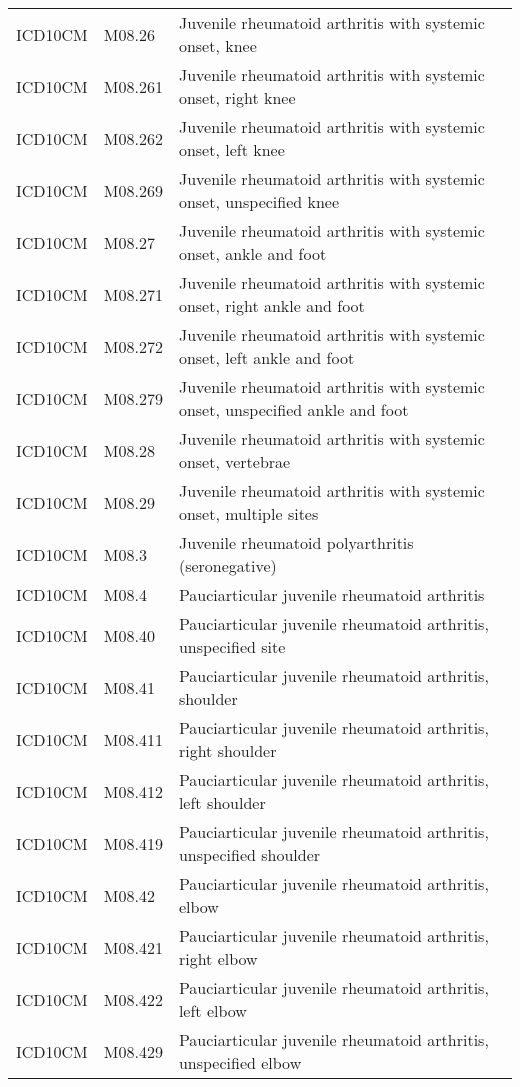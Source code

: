 \begin{longtable}{p{}p{}p{}}
  ICD10CM & M08.26 & Juvenile rheumatoid arthritis with systemic onset, knee \\ 
  ICD10CM & M08.261 & Juvenile rheumatoid arthritis with systemic onset, right knee \\ 
  ICD10CM & M08.262 & Juvenile rheumatoid arthritis with systemic onset, left knee \\ 
  ICD10CM & M08.269 & Juvenile rheumatoid arthritis with systemic onset, unspecified knee \\ 
  ICD10CM & M08.27 & Juvenile rheumatoid arthritis with systemic onset, ankle and foot \\ 
  ICD10CM & M08.271 & Juvenile rheumatoid arthritis with systemic onset, right ankle and foot \\ 
  ICD10CM & M08.272 & Juvenile rheumatoid arthritis with systemic onset, left ankle and foot \\ 
  ICD10CM & M08.279 & Juvenile rheumatoid arthritis with systemic onset, unspecified ankle and foot \\ 
  ICD10CM & M08.28 & Juvenile rheumatoid arthritis with systemic onset, vertebrae \\ 
  ICD10CM & M08.29 & Juvenile rheumatoid arthritis with systemic onset, multiple sites \\ 
  ICD10CM & M08.3 & Juvenile rheumatoid polyarthritis (seronegative) \\ 
  ICD10CM & M08.4 & Pauciarticular juvenile rheumatoid arthritis \\ 
  ICD10CM & M08.40 & Pauciarticular juvenile rheumatoid arthritis, unspecified site \\ 
  ICD10CM & M08.41 & Pauciarticular juvenile rheumatoid arthritis, shoulder \\ 
  ICD10CM & M08.411 & Pauciarticular juvenile rheumatoid arthritis, right shoulder \\ 
  ICD10CM & M08.412 & Pauciarticular juvenile rheumatoid arthritis, left shoulder \\ 
  ICD10CM & M08.419 & Pauciarticular juvenile rheumatoid arthritis, unspecified shoulder \\ 
  ICD10CM & M08.42 & Pauciarticular juvenile rheumatoid arthritis, elbow \\ 
  ICD10CM & M08.421 & Pauciarticular juvenile rheumatoid arthritis, right elbow \\ 
  ICD10CM & M08.422 & Pauciarticular juvenile rheumatoid arthritis, left elbow \\ 
  ICD10CM & M08.429 & Pauciarticular juvenile rheumatoid arthritis, unspecified elbow \\ 

\end{longtable}
